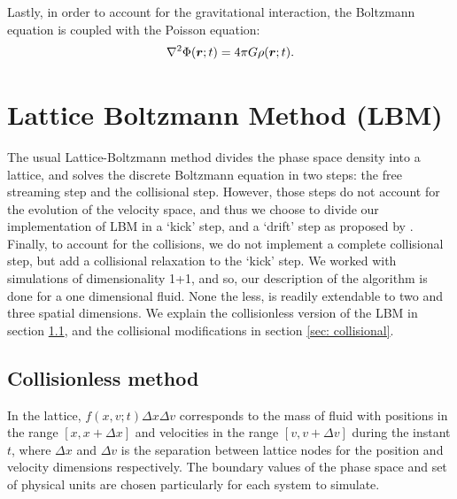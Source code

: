 \documentclass[fleqn,usenatbib]{mnras}
\newcommand{\dens}[1][t]{\rho(\vb*{r};#1)}
\newcommand{\pot}[1][t]{\Phi(\vb*{r};#1)}
\begin{document}
Lastly, in order to account for the gravitational interaction, the Boltzmann equation is coupled with the Poisson equation:
\begin{equation}
\laplacian \pot = 4 \pi G \dens .
\end{equation}
\section{Lattice Boltzmann Method (LBM)}
\label{boltz}
The usual Lattice-Boltzmann method divides the phase space density into a lattice, and solves the discrete Boltzmann equation in two steps: the free streaming step and the collisional step. 
However, those steps do not account for the evolution of the velocity space, and thus we choose to divide our implementation of LBM in a `kick' step, and a `drift' step as proposed by \citet{integerLatticeDynamics}.
Finally, to account for the collisions, we do not implement a complete collisional step, but add a collisional relaxation to the `kick' step.
We worked with simulations of dimensionality 1+1, and so, our description of the algorithm is done for a one dimensional fluid. None the less, is readily extendable to two and three spatial dimensions. We explain the collisionless version of the LBM in section \ref{sec: streaming}, and the collisional modifications in section \ref{sec: collisional}.
\subsection{Collisionless method}
\label{sec: streaming}
In the lattice, $f(x,v;t)\Delta x \Delta v$ corresponds to the mass of fluid with positions in the range $[x, x+\Delta x]$ and velocities in the range $[v, v +\Delta v]$ during the instant $t$, where $\Delta x$ and $\Delta v$ is the separation between lattice nodes for the position and velocity dimensions respectively. The boundary values of the phase space and set of physical units are chosen particularly for each system to simulate.
\end{document}
